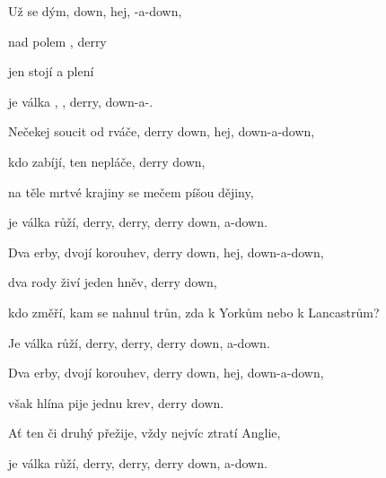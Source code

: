 
\zs
Už  se  dým,  down, hej, -a-down, 

nad  polem , derry   

jen  stojí  a  plení   

je válka , , derry,  down-a-.  \ks

\zs
Nečekej soucit od rváče, derry down, hej, down-a-down, 

kdo zabíjí, ten nepláče, derry down, 

na těle mrtvé krajiny se mečem píšou dějiny, 

je válka růží, derry, derry, derry down, a-down.
\ks

\zs
Dva erby, dvojí korouhev, derry down, hej, down-a-down, 

dva rody živí jeden hněv, derry down, 

kdo změří, kam se nahnul trůn, zda k Yorkům nebo k Lancastrům?

Je válka růží, derry, derry, derry down, a-down.
\ks

\zs
Dva erby, dvojí korouhev, derry down, hej, down-a-down, 

však hlína pije jednu krev, derry down.

Ať ten či druhý přežije, vždy nejvíc ztratí Anglie, 

je válka růží, derry, derry, derry down, a-down.
\ks
\kp

